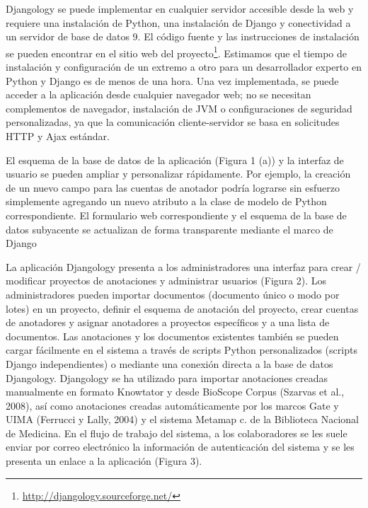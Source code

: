 Djangology se puede implementar en cualquier servidor accesible desde la web y requiere una instalación de Python, una instalación de Django y conectividad a un servidor de base de datos 9. El código fuente y las instrucciones de instalación se pueden encontrar en el sitio web del proyecto\footnote{\url{http://djangology.sourceforge.net/}}. Estimamos que el tiempo de instalación y configuración de un extremo a otro para un desarrollador experto en Python y Django es de menos de una hora. Una vez implementada, se puede acceder a la aplicación desde cualquier navegador web; no se necesitan complementos de navegador, instalación de JVM o configuraciones de seguridad personalizadas, ya que la comunicación cliente-servidor se basa en solicitudes HTTP y Ajax estándar.

El esquema de la base de datos de la aplicación (Figura 1 (a)) y la interfaz de usuario se pueden ampliar y personalizar rápidamente. Por ejemplo, la creación de un nuevo campo para las cuentas de anotador podría lograrse sin esfuerzo simplemente agregando un nuevo atributo a la clase de modelo de Python correspondiente. El formulario web correspondiente y el esquema de la base de datos subyacente se actualizan de forma transparente mediante el marco de Django

La aplicación Djangology presenta a los administradores una interfaz para crear / modificar proyectos de anotaciones y administrar usuarios (Figura 2). Los administradores pueden importar documentos (documento único o modo por lotes) en un proyecto, definir el esquema de anotación del proyecto, crear cuentas de anotadores y asignar anotadores a proyectos específicos y a una lista de documentos. Las anotaciones y los documentos existentes también se pueden cargar fácilmente en el sistema a través de scripts Python personalizados (scripts Django independientes) o mediante una conexión directa a la base de datos Djangology. Djangology se ha utilizado para importar anotaciones creadas manualmente en formato Knowtator y desde BioScope Corpus (Szarvas et al., 2008), así como anotaciones creadas automáticamente por los marcos Gate y UIMA (Ferrucci y Lally, 2004) y el sistema Metamap c. de la Biblioteca Nacional de Medicina. En el flujo de trabajo del sistema, a los colaboradores se les suele enviar por correo electrónico la información de autenticación del sistema y se les presenta un enlace a la aplicación (Figura 3).

